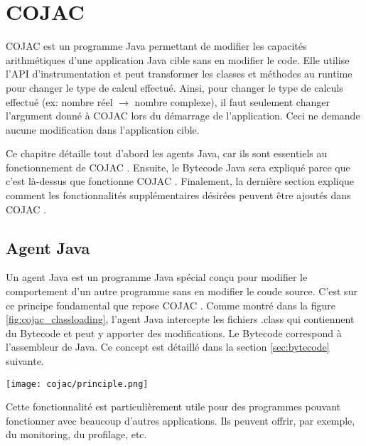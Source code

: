 
\chapter{COJAC}

COJAC \cite{COJAC} est un programme Java permettant de modifier les capacités arithmétiques d'une application Java cible sans en modifier le code. Elle utilise l'API d'instrumentation et peut transformer les classes et méthodes au runtime pour changer le type de calcul effectué. Ainsi, pour changer le type de calculs effectué (ex: nombre réel $\rightarrow$ nombre complexe), il faut seulement changer l'argument donné à COJAC \cite{COJAC} lors du démarrage de l'application. Ceci ne demande aucune modification dans l'application cible.

Ce chapitre détaille tout d'abord les agents Java, car ils sont essentiels au fonctionnement de COJAC \cite{COJAC}. Ensuite, le Bytecode Java sera expliqué parce que c'est là-dessus que fonctionne COJAC \cite{COJAC}. Finalement, la dernière section explique comment les fonctionnalités supplémentaires désirées peuvent être ajoutés dans COJAC \cite{COJAC}.

\section{Agent Java}
\label{sec:agent_java}

Un agent Java est un programme Java spécial conçu pour modifier le comportement d'un autre programme sans en modifier le coude source. C'est sur ce principe fondamental que repose COJAC \cite{COJAC}. Comme montré dans la figure \ref{fig:cojac_classloading}, l'agent Java intercepte les fichiers .class qui contiennent du Bytecode et peut y apporter des modifications. Le Bytecode correspond à l'assembleur de Java. Ce concept est détaillé dans la section \ref{sec:bytecode} suivante.

\begin{minipage}{\linewidth}
    \centering
    \texttt{[image: cojac/principle.png]}
    \label{fig:cojac_classloading}
\end{minipage}

Cette fonctionnalité est particulièrement utile pour des programmes pouvant fonctionner avec beaucoup d'autres applications. Ils peuvent offrir, par exemple, du monitoring, du profilage, etc.

